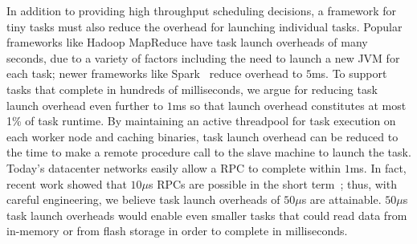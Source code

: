 In addition to providing high throughput scheduling decisions, a framework for
tiny tasks must also reduce the overhead for launching individual tasks.
Popular frameworks like Hadoop MapReduce have task launch overheads of many
seconds, due to a variety of factors including the need to launch a new
JVM for each task; newer frameworks like Spark~\cite{zaharia2010spark} reduce
overhead to $5$ms.
To support tasks that complete in hundreds of milliseconds, we argue for
reducing task launch overhead even further to $1$ms so that launch overhead
constitutes at most 1\% of task runtime.
By maintaining an active threadpool for task execution on each worker node
and caching binaries, task launch overhead can be reduced to the time to
make
 a remote procedure
call to the slave machine to launch the task. Today's datacenter networks
easily allow a RPC to complete within $1$ms. In fact, recent work showed that
$10\mu$s RPCs are possible in the short term~\cite{low-latency}; thus,
with careful engineering, we believe task launch overheads of $50\mu$s are
attainable. $50\mu$s task launch overheads would enable even smaller tasks
that could read data from in-memory or from flash storage in order to complete
in milliseconds.

